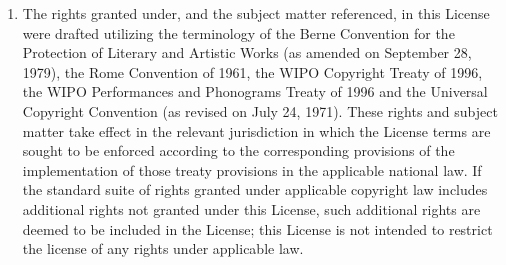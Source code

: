 \begin{enumerate}
          \item The rights granted under, and the subject matter
          referenced, in this License were drafted utilizing the
          terminology of the Berne Convention for the Protection of
          Literary and Artistic Works (as amended on September 28,
          1979), the Rome Convention of 1961, the WIPO Copyright
          Treaty of 1996, the WIPO Performances and Phonograms
          Treaty of 1996 and the Universal Copyright Convention (as
          revised on July 24, 1971). These rights and subject
          matter take effect in the relevant jurisdiction in which
          the License terms are sought to be enforced according to
          the corresponding provisions of the implementation of
          those treaty provisions in the applicable national law.
          If the standard suite of rights granted under applicable
          copyright law includes additional rights not granted
          under this License, such additional rights are deemed to
          be included in the License; this License is not intended
          to restrict the license of any rights under applicable
          law.
\end{enumerate}

